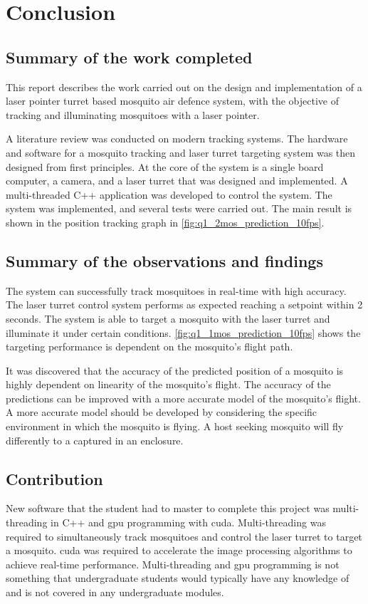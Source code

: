 
\section{Conclusion}

\subsection{Summary of the work completed}
This report describes the work carried out on the design and implementation of a laser pointer turret based mosquito air defence system, with the objective of tracking and illuminating mosquitoes with a laser pointer.

A literature review was conducted on modern tracking systems. The hardware and software for a mosquito tracking and laser turret targeting system was then designed from first principles. At the core of the system is a single board computer, a camera, and a laser turret that was designed and implemented. A multi-threaded C++ application was developed to control the system. The system was implemented, and several tests were carried out. The main result is shown in the position tracking graph in \autoref{fig:q1_2mos_prediction_10fps}.

\subsection{Summary of the observations and findings}
The system can successfully track mosquitoes in real-time with high accuracy. The laser turret control system performs as expected reaching a setpoint within 2 seconds. The system is able to target a mosquito with the laser turret and illuminate it under certain conditions. \autoref{fig:q1_1mos_prediction_10fps} shows the targeting performance is dependent on the mosquito's flight path.

It was discovered that the accuracy of the predicted position of a mosquito is highly dependent on linearity of the mosquito's flight. The accuracy of the predictions can be improved with a more accurate model of the mosquito's flight. A more accurate model should be developed by considering the specific environment in which the mosquito is flying. A host seeking mosquito will fly differently to a captured in an enclosure.

\subsection{Contribution}
New software that the student had to master to complete this project was multi-threading in C++ and \gls{gpu} programming with \gls{cuda}. Multi-threading was required to simultaneously track mosquitoes and control the laser turret to target a mosquito. \gls{cuda} was required to accelerate the image processing algorithms to achieve real-time performance. Multi-threading and \gls{gpu} programming is not something that undergraduate students would typically have any knowledge of and is not covered in any undergraduate modules.

